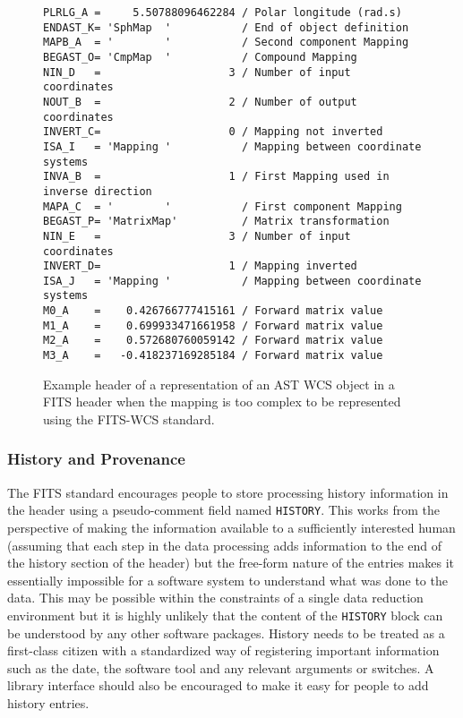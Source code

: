 \documentclass[final,authoryear,5p,times,twocolumn]{elsarticle}
\begin{document}
{{\begin{figure*}
\begin{minipage}{\textwidth}
\begin{verbatim}
PLRLG_A =     5.50788096462284 / Polar longitude (rad.s)
ENDAST_K= 'SphMap  '           / End of object definition
MAPB_A  = '        '           / Second component Mapping
BEGAST_O= 'CmpMap  '           / Compound Mapping
NIN_D   =                    3 / Number of input coordinates
NOUT_B  =                    2 / Number of output coordinates
INVERT_C=                    0 / Mapping not inverted
ISA_I   = 'Mapping '           / Mapping between coordinate systems
INVA_B  =                    1 / First Mapping used in inverse direction
MAPA_C  = '        '           / First component Mapping
BEGAST_P= 'MatrixMap'          / Matrix transformation
NIN_E   =                    3 / Number of input coordinates
INVERT_D=                    1 / Mapping inverted
ISA_J   = 'Mapping '           / Mapping between coordinate systems
M0_A    =    0.426766777415161 / Forward matrix value
M1_A    =    0.699933471661958 / Forward matrix value
M2_A    =    0.572680760059142 / Forward matrix value
M3_A    =   -0.418237169285184 / Forward matrix value
\end{verbatim}
\caption{Example header of a representation of an AST WCS object in a
  FITS header  when the mapping is too complex to be represented using the
  FITS-WCS standard.}
\label{fig:asthead}
\end{minipage}
\end{figure*}


\subsubsection{History and Provenance}


The FITS standard encourages people to store processing history
information in the header using a pseudo-comment field named
\texttt{HISTORY}. This works from the perspective of making the information
available to a sufficiently interested human (assuming that each step in the
data processing adds information to the end of the history section of the
header) but the free-form nature of the entries makes it essentially
impossible for a software system to understand what was done to the data.
This may be possible within the constraints of a single data reduction
environment but it is highly unlikely that the content of the
\texttt{HISTORY} block can be understood by any other software packages. History
needs to be treated as a first-class citizen with a standardized way of
registering important information such as the date, the software tool and
any relevant arguments or switches. A library interface should also be
encouraged to make it easy for people to add history entries.


}}
\end{document}
